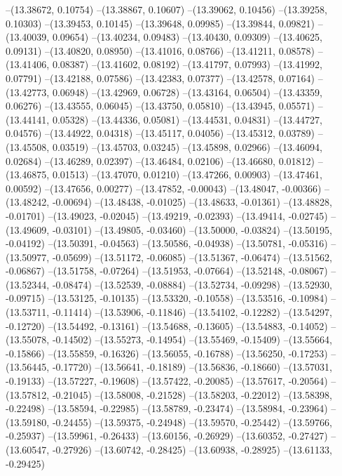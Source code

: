 --(13.38672, 0.10754)
--(13.38867, 0.10607)
--(13.39062, 0.10456)
--(13.39258, 0.10303)
--(13.39453, 0.10145)
--(13.39648, 0.09985)
--(13.39844, 0.09821)
--(13.40039, 0.09654)
--(13.40234, 0.09483)
--(13.40430, 0.09309)
--(13.40625, 0.09131)
--(13.40820, 0.08950)
--(13.41016, 0.08766)
--(13.41211, 0.08578)
--(13.41406, 0.08387)
--(13.41602, 0.08192)
--(13.41797, 0.07993)
--(13.41992, 0.07791)
--(13.42188, 0.07586)
--(13.42383, 0.07377)
--(13.42578, 0.07164)
--(13.42773, 0.06948)
--(13.42969, 0.06728)
--(13.43164, 0.06504)
--(13.43359, 0.06276)
--(13.43555, 0.06045)
--(13.43750, 0.05810)
--(13.43945, 0.05571)
--(13.44141, 0.05328)
--(13.44336, 0.05081)
--(13.44531, 0.04831)
--(13.44727, 0.04576)
--(13.44922, 0.04318)
--(13.45117, 0.04056)
--(13.45312, 0.03789)
--(13.45508, 0.03519)
--(13.45703, 0.03245)
--(13.45898, 0.02966)
--(13.46094, 0.02684)
--(13.46289, 0.02397)
--(13.46484, 0.02106)
--(13.46680, 0.01812)
--(13.46875, 0.01513)
--(13.47070, 0.01210)
--(13.47266, 0.00903)
--(13.47461, 0.00592)
--(13.47656, 0.00277)
--(13.47852, -0.00043)
--(13.48047, -0.00366)
--(13.48242, -0.00694)
--(13.48438, -0.01025)
--(13.48633, -0.01361)
--(13.48828, -0.01701)
--(13.49023, -0.02045)
--(13.49219, -0.02393)
--(13.49414, -0.02745)
--(13.49609, -0.03101)
--(13.49805, -0.03460)
--(13.50000, -0.03824)
--(13.50195, -0.04192)
--(13.50391, -0.04563)
--(13.50586, -0.04938)
--(13.50781, -0.05316)
--(13.50977, -0.05699)
--(13.51172, -0.06085)
--(13.51367, -0.06474)
--(13.51562, -0.06867)
--(13.51758, -0.07264)
--(13.51953, -0.07664)
--(13.52148, -0.08067)
--(13.52344, -0.08474)
--(13.52539, -0.08884)
--(13.52734, -0.09298)
--(13.52930, -0.09715)
--(13.53125, -0.10135)
--(13.53320, -0.10558)
--(13.53516, -0.10984)
--(13.53711, -0.11414)
--(13.53906, -0.11846)
--(13.54102, -0.12282)
--(13.54297, -0.12720)
--(13.54492, -0.13161)
--(13.54688, -0.13605)
--(13.54883, -0.14052)
--(13.55078, -0.14502)
--(13.55273, -0.14954)
--(13.55469, -0.15409)
--(13.55664, -0.15866)
--(13.55859, -0.16326)
--(13.56055, -0.16788)
--(13.56250, -0.17253)
--(13.56445, -0.17720)
--(13.56641, -0.18189)
--(13.56836, -0.18660)
--(13.57031, -0.19133)
--(13.57227, -0.19608)
--(13.57422, -0.20085)
--(13.57617, -0.20564)
--(13.57812, -0.21045)
--(13.58008, -0.21528)
--(13.58203, -0.22012)
--(13.58398, -0.22498)
--(13.58594, -0.22985)
--(13.58789, -0.23474)
--(13.58984, -0.23964)
--(13.59180, -0.24455)
--(13.59375, -0.24948)
--(13.59570, -0.25442)
--(13.59766, -0.25937)
--(13.59961, -0.26433)
--(13.60156, -0.26929)
--(13.60352, -0.27427)
--(13.60547, -0.27926)
--(13.60742, -0.28425)
--(13.60938, -0.28925)
--(13.61133, -0.29425)
